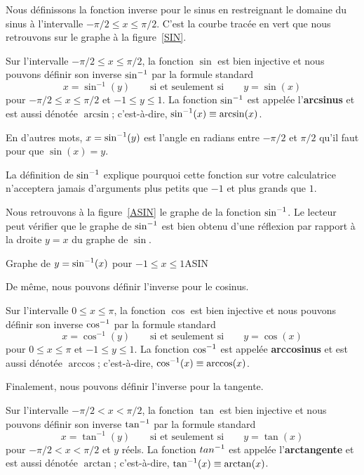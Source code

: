 {Nous définissons la fonction inverse pour le sinus en restreignant le
domaine du sinus à l'intervalle $-\pi/2 \leq x \leq \pi/2$.  C'est la
courbe tracée en vert que nous retrouvons sur le graphe
à la figure~\ref{SIN}.

\begin{defn} 
Sur l'intervalle $-\pi/2 \leq x \leq \pi/2$, la fonction $\sin$ est
bien injective et nous pouvons définir son inverse $\displaystyle \sin^{-1}$ par la
formule standard
\[
x = \sin^{-1}(y) \qquad \text{si et seulement si} \qquad y = \sin(x)
\]
pour $-\pi/2 \leq x \leq \pi/2$ et $-1 \leq y \leq 1$.  La fonction
$\displaystyle \sin^{-1}$ est appelée l'{\bfseries arcsinus} et est
aussi dénotée $\arcsin$; c'est-à-dire, $\displaystyle \sin^{-1}(x) \equiv \arcsin(x)$.
\end{defn}

En d'autres mots, $\displaystyle x = \sin^{-1}(y)$ est l'angle en radians entre
$-\pi/2$ et $\pi/2$ qu'il faut pour que $\sin(x) = y$.

La définition de $\displaystyle \sin^{-1}$ explique pourquoi cette fonction sur
votre calculatrice n'acceptera jamais d'arguments plus petits que $-1$
et plus grands que $1$.

Nous retrouvons à la figure~\ref{ASIN} le graphe de la fonction
$\displaystyle \sin^{-1}$.  Le lecteur peut vérifier que le graphe de $\displaystyle \sin^{-1}$
est bien obtenu d'une réflexion par rapport à la droite $y=x$ du
graphe de $\sin$.

{Graphe de $\displaystyle y=\sin^{-1}(x)$ pour $-1 \leq x \leq 1$}{ASIN}

De même, nous pouvons définir l'inverse pour le cosinus.

\begin{defn} 
Sur l'intervalle $0 \leq x \leq \pi$, la fonction $\cos$ est bien
injective et nous pouvons définir son inverse $\displaystyle \cos^{-1}$ par la formule
standard
\[
x = \cos^{-1}(y) \qquad \text{si et seulement si} \qquad y = \cos(x)
\]
pour $0 \leq x \leq \pi$ et $-1 \leq y \leq 1$.  La fonction
$\displaystyle \cos^{-1}$ est appelée {\bfseries arccosinus} et
est aussi dénotée $\arccos$; c'est-à-dire,
$\displaystyle \cos^{-1}(x) \equiv \arccos(x)$.
\end{defn}

Finalement, nous pouvons définir l'inverse pour la tangente.

\begin{defn} 
Sur l'intervalle $-\pi/2 < x < \pi/2$,  la fonction $\tan$ est bien
injective et nous pouvons définir son inverse $\displaystyle \tan^{-1}$ par la formule
standard
\[
x = \tan^{-1}(y) \qquad \text{si et seulement si} \qquad y = \tan(x)
\]
pour $-\pi/2 < x < \pi/2$ et $y$ réels.  La fonction $\displaystyle tan^{-1}$ est
appelée l'{\bfseries arctangente} et est aussi
dénotée $\arctan$; c'est-à-dire, $\displaystyle \tan^{-1}(x) \equiv \arctan(x)$.
\end{defn}

}
